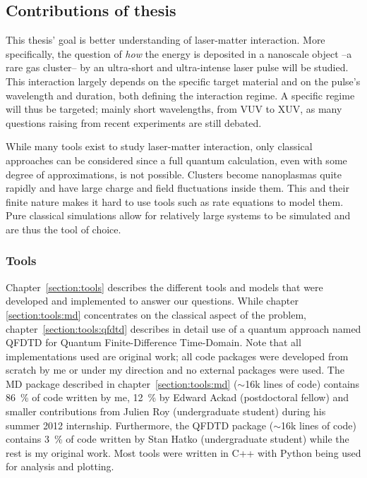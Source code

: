 \clearpage
\subsection{Contributions of thesis}

This thesis' goal is better understanding of
laser-matter interaction.
More specifically, the
question of \textit{how} the energy is deposited in a nanoscale object
--a rare gas cluster-- by an
ultra-short and ultra-intense laser pulse will be studied. This interaction
largely depends on the specific target material and on the pulse's wavelength
and duration, both defining the interaction regime. A specific regime will
thus be targeted; mainly short wavelengths, from VUV to XUV, as many questions
raising from recent experiments are still debated.

While many tools exist to study laser-matter interaction, only classical
approaches can be considered since a full quantum calculation, even
with some degree of approximations, is not possible. Clusters become
nanoplasmas quite rapidly and have large charge and field fluctuations inside
them. This and their finite nature makes it hard to use tools such as rate
equations to model them. Pure classical simulations allow for relatively large
systems to be simulated and are thus the tool of choice.


\subsubsection{Tools}

Chapter~\ref{section:tools} describes the different tools and models
that were developed and implemented to answer our questions. While chapter
\ref{section:tools:md} concentrates on the classical aspect of the problem,
chapter~\ref{section:tools:qfdtd} describes in detail use of a quantum approach
named QFDTD for Quantum Finite-Difference Time-Domain.
Note that all implementations used are original work; all code packages
were developed from scratch by me or under my direction and no external packages
were used. The MD package described in
chapter~\ref{section:tools:md} ($\sim$16k lines of code) contains 86~\% of code
written by me, 12~\% by Edward Ackad (postdoctoral fellow) and smaller contributions from
Julien Roy (undergraduate student) during his summer 2012 internship. Furthermore, the QFDTD package
($\sim$16k lines of code) contains 3~\% of code written by Stan Hatko (undergraduate student) while the
rest is my original work. Most tools were written in C++ with Python being used
for analysis and plotting.


